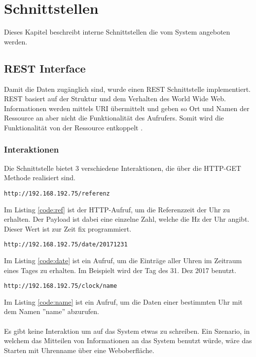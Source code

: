 \section{Schnittstellen}
Dieses Kapitel beschreibt interne Schnittstellen die vom System angeboten werden.
\subsection{REST Interface}\label{sec:rest}
Damit die Daten zugänglich sind, wurde einen REST Schnittstelle implementiert.\\
REST basiert auf der Struktur und dem Verhalten des World Wide Web. Informationen werden mittels URI übermittelt und geben so Ort und Namen der Ressource an aber nicht die Funktionalität des Aufrufers. Somit wird die Funktionalität von der Ressource entkoppelt \cite{rest}.
\subsubsection{Interaktionen}
Die Schnittstelle bietet 3 verschiedene Interaktionen, die über die HTTP-GET Methode realisiert sind.\\

\begin{lstlisting}[caption="Lesen der Referenzzeit",label={code:ref}]
http://192.168.192.75/referenz
\end{lstlisting}
Im Listing \ref{code:ref} ist der HTTP-Aufruf, um die Referenzzeit der Uhr zu erhalten. Der Payload ist dabei eine einzelne Zahl, welche die Hz der Uhr angibt. Dieser Wert ist zur Zeit fix programmiert.\\

\begin{lstlisting}[caption="Lesen eines bestimmten Tages",label={code:date}]
http://192.168.192.75/date/20171231
\end{lstlisting}
Im Listing \ref{code:date} ist ein Aufruf, um die Einträge aller Uhren im Zeitraum eines Tages zu erhalten. Im Beispielt wird der Tag des 31. Dez 2017 benutzt.\\

\begin{lstlisting}[caption="Lesen einer bestimmten Uhr",label={code:name}]
http://192.168.192.75/clock/name
\end{lstlisting}
Im Listing \ref{code:name} ist ein Aufruf, um die Daten einer bestimmten Uhr mit dem Namen ''name'' abzurufen.\\
\\
Es gibt keine Interaktion um auf das System etwas zu schreiben. Ein Szenario, in welchem das Mitteilen von Informationen an das System benutzt würde, wäre das Starten mit Uhrenname über eine Weboberfläche.


